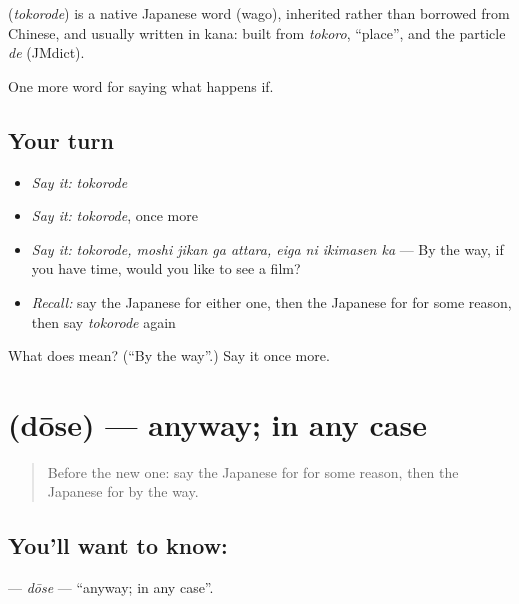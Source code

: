 \begin{cousinweb}
\textbf{} (\emph{tokorode}) is a native Japanese word (wago), inherited rather than borrowed from Chinese, and usually written in kana: built from \emph{tokoro}, \textquotedblleft{}place\textquotedblright{}, and the particle \emph{de} (JMdict).
\end{cousinweb}

\begin{grammarlens}[title={What you've built}]
One more word for saying what happens if.
\end{grammarlens}

\subsection*{Your turn}
\begin{itemize}
\raggedright
  \item \emph{Say it:} \emph{tokorode}
  \item \emph{Say it:} \emph{tokorode}, once more
  \item \emph{Say it:} \emph{tokorode, moshi jikan ga attara, eiga ni ikimasen ka} — By the way, if you have time, would you like to see a film?
  \item \emph{Recall:} say the Japanese for either one, then the Japanese for for some reason, then say \emph{tokorode} again
\end{itemize}

\begin{tcolorbox}[breakable,colback=teal!4,colframe=teal!35!black,title={Before you move on}]
What does  mean? (\textquotedblleft{}By the way\textquotedblright{}.) Say it once more.
\end{tcolorbox}
\section[\texorpdfstring{\ja{どうせ} (dōse)}{どうせ (dōse)}]{ (dōse) — anyway; in any case}

\label{lesson:JA-C529-douse}



\begin{quote}
Before the new one: say the Japanese for for some reason, then the Japanese for by the way.
\end{quote}

\subsection*{You'll want to know: }
\textbf{} — \emph{dōse} — \textquotedblleft{}anyway; in any case\textquotedblright{}.

